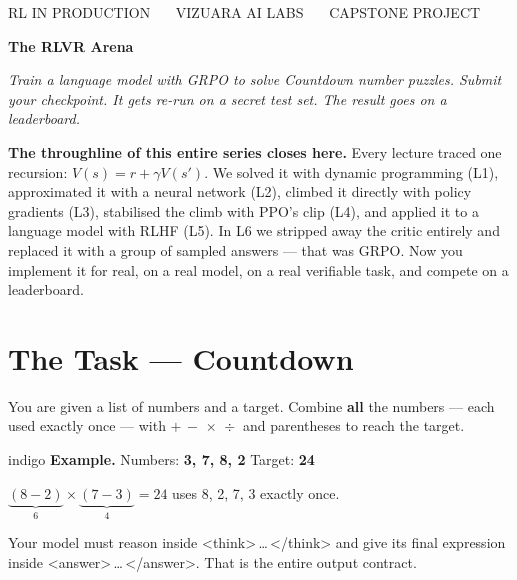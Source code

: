 \documentclass[11pt]{article}
\newcommand{\eyebrow}[1]{{\sanstrack\footnotesize\color{ink3}\MakeUppercase{#1}}\par\vspace{0.2em}}
\newcommand{\codesm}[1]{{\ttfamily\footnotesize #1}}
\begin{document}
\thispagestyle{empty}

\vspace*{0.3cm}
\eyebrow{RL in Production \ \textbullet\ \ Vizuara AI Labs \ \textbullet\ \ Capstone Project}
\vspace{0.3cm}

{\fontsize{28}{33}\selectfont \textbf{The RLVR Arena}\par}
\vspace{0.2cm}
{\fontsize{14}{18}\selectfont\color{ink2}\itshape
Train a language model with GRPO to solve Countdown number puzzles.
Submit your checkpoint. It gets re-run on a secret test set.
The result goes on a leaderboard.\par}

\vspace{0.5cm}{\color{ink3}\rule{\textwidth}{0.4pt}}\vspace{0.3cm}

\begin{herobox}
\textbf{The throughline of this entire series closes here.}
Every lecture traced one recursion: $V(s) = r + \gamma V(s')$.
We solved it with dynamic programming (L1), approximated it with a neural network (L2),
climbed it directly with policy gradients (L3), stabilised the climb with PPO's clip (L4),
and applied it to a language model with RLHF (L5).
In L6 we stripped away the critic entirely and replaced it with a group of sampled answers ---
that was GRPO.
Now you implement it for real, on a real model, on a real verifiable task,
and compete on a leaderboard.
\end{herobox}

\section{The Task --- Countdown}

You are given a list of numbers and a target.
Combine \textbf{all} the numbers --- each used exactly once --- with $+\,-\,\times\,\div$ and parentheses to reach the target.

\begin{qbox}{indigo}
\textbf{Example.} \quad Numbers: \textbf{3, 7, 8, 2} \quad Target: \textbf{24}

\vspace{0.3em}
\hspace{2em}$\underbrace{(8 - 2)}_6 \times \underbrace{(7 - 3)}_4 = 24$ \quad\checkmark
\quad uses 8, 2, 7, 3 exactly once.

\vspace{0.3em}
Your model must reason inside \codesm{<think>\,\ldots\,</think>} and give its final expression inside \codesm{<answer>\,\ldots\,</answer>}.
That is the entire output contract.
\end{qbox}
\end{document}
